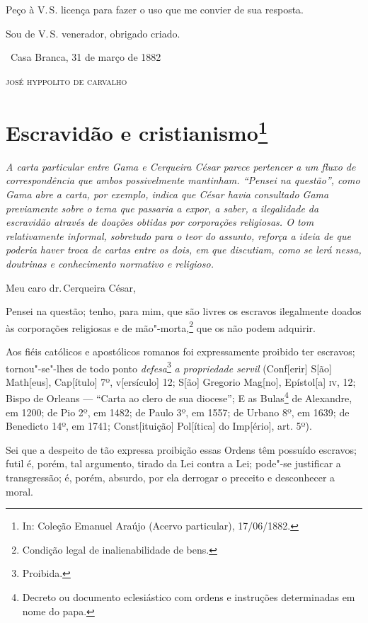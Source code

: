 Peço à V.\,S. licença para fazer o uso que me convier de sua resposta.

Sou de V.\,S. venerador, obrigado criado.\bigskip

\hfill\ Casa Branca, 31 de março de 1882\smallskip

\hfill\textsc{josé hyppolito de carvalho}

\chapter{Escravidão e cristianismo\footnote[*]{In: Coleção Emanuel
  Araújo (Acervo particular), 17/06/1882.}}

\begin{flushleft}
{\footnotesize\itshape
A carta particular entre Gama e Cerqueira César parece pertencer a
um fluxo de correspondência que ambos possivelmente mantinham. ``Pensei
na questão'', como Gama abre a carta, por exemplo, indica que César havia
consultado Gama previamente sobre o tema que passaria a expor, a saber,
a ilegalidade da escravidão através de doações obtidas por corporações
religiosas. O tom relativamente informal, sobretudo para o teor do
assunto, reforça a ideia de que poderia haver troca de cartas entre os
dois, em que discutiam, como se lerá nessa, doutrinas e conhecimento
normativo e religioso. }
\end{flushleft}

\noindent{}Meu caro dr.\,Cerqueira César,\smallskip

Pensei na questão; tenho, para mim, que são livres os escravos
ilegalmente doados às corporações religiosas e de mão"-morta,\footnote{
  Condição legal de inalienabilidade de bens.} que os não podem
adquirir.

Aos fiéis católicos e apostólicos romanos foi expressamente proibido ter
escravos; tornou"-se"-lhes de todo ponto \emph{defesa}\footnote{
  Proibida.} \emph{a propriedade servil} (Conf{[}erir{]} S{[}ão{]}
Math{[}eus{]}, Cap{[}ítulo{]} 7º, v{[}ersículo{]} 12; S{[}ão{]} Gregorio
Mag{[}no{]}, Epístol{[}a{]} \textsc{iv}, 12; Bispo de Orleans --- ``Carta ao
clero de sua diocese''; E as Bulas\footnote{Decreto ou documento
  eclesiástico com ordens e instruções determinadas em nome do papa.}
de Alexandre, em 1200; de Pio 2º, em 1482; de Paulo
3º, em 1557; de Urbano 8º, em 1639; de Benedicto 14º, em 1741;
Const{[}ituição{]} Pol{[}ítica{]} do Imp{[}ério{]}, art. 5º).

Sei que a despeito de tão expressa proibição essas Ordens têm possuído
escravos; futil é, porém, tal argumento, tirado da Lei contra a Lei;
pode"-se justificar a transgressão; é, porém, absurdo, por ela derrogar o
preceito e desconhecer a moral.


